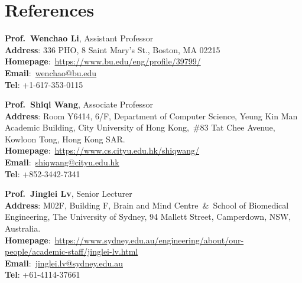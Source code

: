\documentclass{my_cv}
\begin{document}
\hspace*{\fill}


\section{\textbf{References}}
\noindent \textbf{Prof.~Wenchao Li}, Assistant Professor \\
\textbf{Address}: 336 PHO, 8 Saint Mary's St., Boston, MA 02215\\
\textbf{Homepage}:~\href{https://www.bu.edu/eng/profile/39799/}{https://www.bu.edu/eng/profile/39799/}\\
\textbf{Email}:~\href{mailto:wenchao@bu.edu}{wenchao@bu.edu}\\
\textbf{Tel}: +1-617-353-0115

\hspace*{\fill}

\noindent \textbf{Prof.~Shiqi Wang}, Associate Professor\\
\textbf{Address}: Room Y6414, 6/F, Department of Computer Science, Yeung Kin Man Academic Building, City University of Hong Kong,~\#83 Tat Chee Avenue, Kowloon Tong, Hong Kong SAR.\\
\textbf{Homepage}:~\href{https://www.cs.cityu.edu.hk/~shiqwang/}{https://www.cs.cityu.edu.hk/shiqwang/}\\
\textbf{Email}:~\href{mailto:shiqwang@cityu.edu.hk}{shiqwang@cityu.edu.hk}\\
\textbf{Tel}: +852-3442-7341 

\hspace*{\fill}
 
\noindent\textbf{Prof.~Jinglei Lv}, Senior Lecturer\\
\textbf{Address}: M02F, Building F, Brain and Mind Centre~\&~School of Biomedical Engineering, The University of Sydney, 94 Mallett Street, Camperdown, NSW, Australia.\\
\textbf{Homepage}:~\href{https://www.sydney.edu.au/engineering/about/our-people/academic-staff/jinglei-lv.html}{https://www.sydney.edu.au/engineering/about/our-people/academic-staff/jinglei-lv.html}\\
\textbf{Email}:~\href{mailto:jinglei.lv@sydney.edu.au}{jinglei.lv@sydney.edu.au}\\
\textbf{Tel}: +61-4114-37661

\hspace*{\fill}
\end{document}
